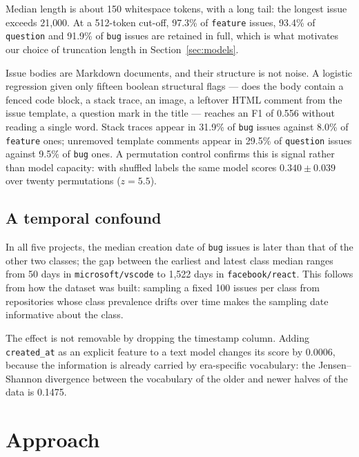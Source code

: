 \documentclass[10pt,a4paper]{article}
\begin{document}
Median length is about 150 whitespace tokens, with a long tail: the longest
issue exceeds 21{,}000. At a 512-token cut-off, 97.3\% of \texttt{feature}
issues, 93.4\% of \texttt{question} and 91.9\% of \texttt{bug} issues are
retained in full, which is what motivates our choice of truncation length in
Section~\ref{sec:models}.

Issue bodies are Markdown documents, and their structure is not noise. A
logistic regression given only fifteen boolean structural flags --- does the
body contain a fenced code block, a stack trace, an image, a leftover HTML
comment from the issue template, a question mark in the title --- reaches an F1
of 0.556 without reading a single word. Stack traces appear in 31.9\% of
\texttt{bug} issues against 8.0\% of \texttt{feature} ones; unremoved template
comments appear in 29.5\% of \texttt{question} issues against 9.5\% of
\texttt{bug} ones. A permutation control confirms this is signal rather than
model capacity: with shuffled labels the same model scores
$0.340 \pm 0.039$ over twenty permutations ($z = 5.5$).

\subsection{A temporal confound}
\label{sec:confound}

In all five projects, the median creation date of \texttt{bug} issues is later
than that of the other two classes; the gap between the earliest and latest
class median ranges from 50 days in \texttt{microsoft/vscode} to 1{,}522 days
in \texttt{facebook/react}. This follows from how the dataset was built:
sampling a fixed 100 issues per class from repositories whose class prevalence
drifts over time makes the sampling date informative about the class.



The effect is not removable by dropping the timestamp column. Adding
\texttt{created\_at} as an explicit feature to a text model changes its score
by 0.0006, because the information is already carried by era-specific
vocabulary: the Jensen--Shannon divergence between the vocabulary of the older
and newer halves of the data is 0.1475.

\section{Approach}
\label{sec:approach}
\end{document}
